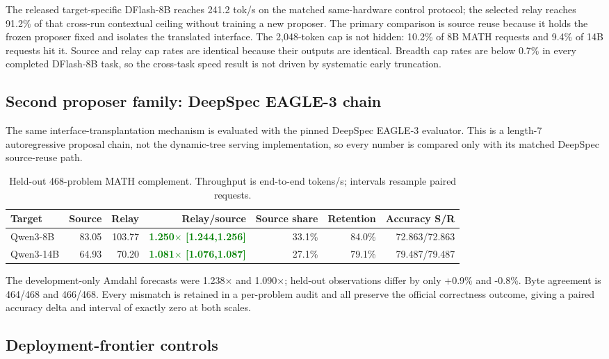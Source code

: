 \documentclass[10pt]{article}
\newcommand{\good}[1]{\textbf{\textcolor{green}{#1}}}
\newcommand{\code}[1]{\texttt{\detokenize{#1}}}
\begin{document}
The released target-specific DFlash-8B reaches 241.2 tok/s on the matched
same-hardware control protocol; the selected relay reaches 91.2\% of that
cross-run contextual ceiling without training a new
proposer. The primary comparison is source reuse because it holds the frozen
proposer fixed and isolates the translated interface.
The 2,048-token cap is not hidden: 10.2\% of 8B MATH requests and 9.4\% of
14B requests hit it. Source and relay cap rates are identical because their
outputs are identical. Breadth cap rates are below 0.7\% in every completed
DFlash-8B task, so the cross-task speed result is not driven by systematic
early truncation.

\subsection{Second proposer family: DeepSpec EAGLE-3 chain}

The same interface-transplantation mechanism is evaluated with the pinned
DeepSpec EAGLE-3 \code{ttt7} evaluator. This is a length-7 autoregressive
proposal chain, not the dynamic-tree serving implementation, so every number is
compared only with its matched DeepSpec source-reuse path.

\begin{table}[H]
\centering
\small
\begin{tabular}{@{}lrrrrrr@{}}
\toprule
Target & Source & Relay & Relay/source & Source share & Retention & Accuracy S/R \\
\midrule
Qwen3-8B & 83.05 & 103.77 & \good{1.250$\times$ [1.244,1.256]} & 33.1\% & 84.0\% & 72.863/72.863 \\
Qwen3-14B & 64.93 & 70.20 & \good{1.081$\times$ [1.076,1.087]} & 27.1\% & 79.1\% & 79.487/79.487 \\
\bottomrule
\end{tabular}
\caption{Held-out 468-problem MATH complement. Throughput is end-to-end
tokens/s; intervals resample paired requests.}
\end{table}

The development-only Amdahl forecasts were 1.238$\times$ and 1.090$\times$;
held-out observations differ by only +0.9\% and -0.8\%. Byte agreement is
464/468 and 466/468. Every mismatch is retained in a per-problem audit and all
preserve the official correctness outcome, giving a paired accuracy delta and
interval of exactly zero at both scales.

\subsection{Deployment-frontier controls}
\end{document}
